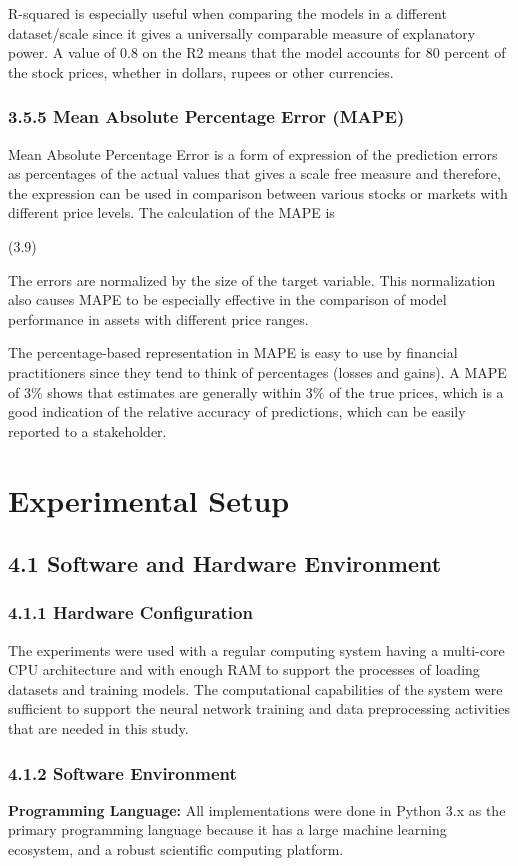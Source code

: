 \documentclass[12pt,a4paper]{report}
\begin{document}
R-squared is especially useful when comparing the models in a different dataset/scale since it gives a universally comparable measure of explanatory power. A value of 0.8 on the R2 means that the model accounts for 80 percent of the stock prices, whether in dollars, rupees or other currencies.

\subsection{3.5.5 Mean Absolute Percentage Error (MAPE)}
Mean Absolute Percentage Error is a form of expression of the prediction errors as percentages of the actual values that gives a scale free measure and therefore, the expression can be used in comparison between various stocks or markets with different price levels. The calculation of the MAPE is

								(3.9)

The errors are normalized by the size of the target variable. This normalization also causes MAPE to be especially effective in the comparison of model performance in assets with different price ranges.

The percentage-based representation in MAPE is easy to use by financial practitioners since they tend to think of percentages (losses and gains). A MAPE of 3\% shows that estimates are generally within 3\% of the true prices, which is a good indication of the relative accuracy of predictions, which can be easily reported to a stakeholder.

\chapter{Experimental Setup}
\label{ch:4}
\section{4.1 Software and Hardware Environment}
\subsection{4.1.1 Hardware Configuration}
The experiments were used with a regular computing system having a multi-core CPU architecture and with enough RAM to support the processes of loading datasets and training models. The computational capabilities of the system were sufficient to support the neural network training and data preprocessing activities that are needed in this study.

\subsection{4.1.2 Software Environment}
\textbf{Programming Language:} All implementations were done in Python 3.x as the primary programming language because it has a large machine learning ecosystem, and a robust scientific computing platform.
\end{document}
